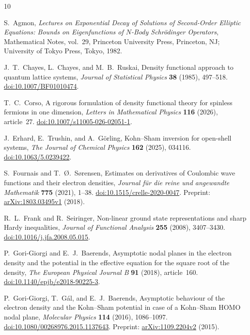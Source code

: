 \begin{thebibliography}{10}

S.~Agmon,
\emph{Lectures on Exponential Decay of Solutions of Second-Order
Elliptic Equations: Bounds on Eigenfunctions of \(N\)-Body
Schr\"odinger Operators},
Mathematical Notes, vol.~29,
Princeton University Press, Princeton, NJ;
University of Tokyo Press, Tokyo, 1982.

J.~T.~Chayes, L.~Chayes, and M.~B.~Ruskai,
Density functional approach to quantum lattice systems,
\emph{Journal of Statistical Physics} \textbf{38} (1985), 497--518.
\href{https://doi.org/10.1007/BF01010474}{doi:10.1007/BF01010474}.

T.~C.~Corso,
A rigorous formulation of density functional theory for spinless
fermions in one dimension,
\emph{Letters in Mathematical Physics} \textbf{116} (2026), article~27.
\href{https://doi.org/10.1007/s11005-026-02051-1}{doi:10.1007/s11005-026-02051-1}.

J.~Erhard, E.~Trushin, and A.~G\"orling,
Kohn--Sham inversion for open-shell systems,
\emph{The Journal of Chemical Physics} \textbf{162} (2025), 034116.
\href{https://doi.org/10.1063/5.0239422}{doi:10.1063/5.0239422}.

S.~Fournais and T.~{\O}.~S{\o}rensen,
Estimates on derivatives of Coulombic wave functions and their
electron densities,
\emph{Journal f\"ur die reine und angewandte Mathematik}
\textbf{775} (2021), 1--38.
\href{https://doi.org/10.1515/crelle-2020-0047}{doi:10.1515/crelle-2020-0047}.
Preprint: \href{https://arxiv.org/abs/1803.03495v1}{arXiv:1803.03495v1} (2018).

R.~L.~Frank and R.~Seiringer,
Non-linear ground state representations and sharp Hardy inequalities,
\emph{Journal of Functional Analysis} \textbf{255} (2008), 3407--3430.
\href{https://doi.org/10.1016/j.jfa.2008.05.015}{doi:10.1016/\allowbreak j.jfa.2008.05.015}.

P.~Gori-Giorgi and E.~J.~Baerends,
Asymptotic nodal planes in the electron density and the potential
in the effective equation for the square root of the density,
\emph{The European Physical Journal B} \textbf{91} (2018), article~160.
\href{https://doi.org/10.1140/epjb/e2018-90225-3}{doi:10.1140/epjb/e2018-90225-3}.

P.~Gori-Giorgi, T.~G\'al, and E.~J.~Baerends,
Asymptotic behaviour of the electron density and the Kohn--Sham
potential in case of a Kohn--Sham HOMO nodal plane,
\emph{Molecular Physics} \textbf{114} (2016), 1086--1097.
\href{https://doi.org/10.1080/00268976.2015.1137643}{doi:10.1080/00268976.2015.1137643}.
Preprint: \href{https://arxiv.org/abs/1109.2204v2}{arXiv:1109.2204v2} (2015).


\end{thebibliography}
